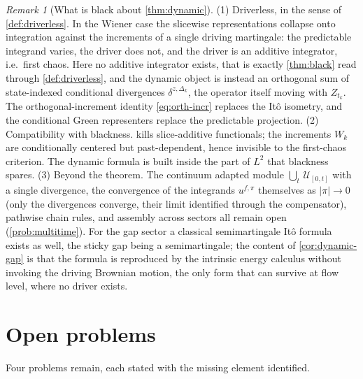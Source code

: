 \documentclass[reqno,final,11pt]{amsart}
\theoremstyle{plain}
\theoremstyle{definition}
\theoremstyle{remark}
\newtheorem{remark}[theorem]{Remark}
\newcommand{\cU}{\mathcal U}
\begin{document}
\begin{remark}[What is black about \cref{thm:dynamic}]\label{rem:driverless}
\textnormal{(1)} Driverless, in the sense of \cref{def:driverless}. In
the Wiener case the slicewise
representations collapse onto integration against the increments of a single
driving martingale: the predictable integrand varies, the driver does not, and
the driver is an additive integrator, i.e.\ first chaos. Here no additive
integrator exists, that is exactly \cref{thm:black} read through
\cref{def:driverless}, and the dynamic object is instead an orthogonal sum of
state-indexed conditional divergences $\delta^{z,\Delta_k}$, the
operator itself moving with $Z_{t_k}$. The orthogonal-increment identity
\eqref{eq:orth-incr} replaces the It\^o isometry, and the conditional Green
representers replace the predictable projection.
\textnormal{(2)} Compatibility with blackness.  kills
slice-additive functionals; the increments $W_k$ are conditionally centered
but past-dependent, hence invisible to the first-chaos criterion. The dynamic
formula is built inside the part of $L^2$ that blackness spares.
\textnormal{(3)} Beyond the theorem. The continuum adapted module
$\bigcup_t\,\cU_{[0,t]}$ with a single divergence, the convergence of the
integrands $u^{f,\pi}$ themselves as $|\pi|\to0$ (only the divergences
converge, their limit identified through the compensator), pathwise chain
rules, and assembly across sectors all remain open
(\cref{prob:multitime}). For the gap
sector a classical semimartingale It\^o formula exists as well, the sticky gap
being a semimartingale; the content of \cref{cor:dynamic-gap} is that the
formula is reproduced by the intrinsic energy calculus without invoking the
driving Brownian motion, the only form that can survive at flow level,
where no driver exists.
\end{remark}

\section{Open problems}\label{sec:openproblems}

Four problems remain, each stated with the missing element identified.
\end{document}
